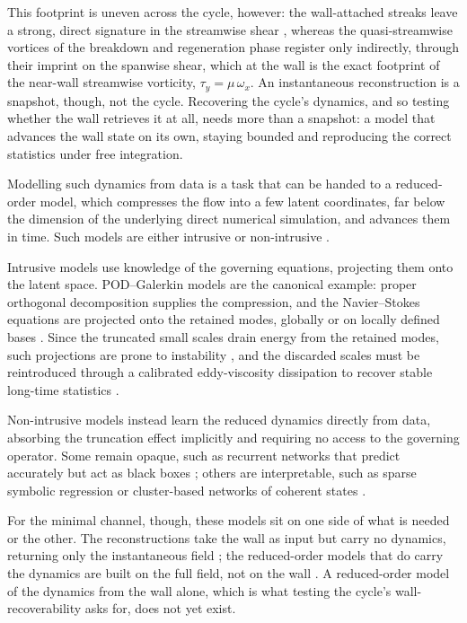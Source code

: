 \documentclass[pdflatex,sn-basic]{sn-jnl}
\theoremstyle{thmstyleone}%
\theoremstyle{thmstyletwo}%
\theoremstyle{thmstylethree}%
\begin{document}
This footprint is uneven across the cycle, however: the wall-attached streaks
leave a strong, direct signature in the streamwise shear
\citep{robinson1991coherent}, whereas the quasi-streamwise vortices of the
breakdown and regeneration phase register only indirectly, through their imprint
on the spanwise shear, which at the wall is the exact footprint of the near-wall
streamwise vorticity, $\tau_y = \mu\,\omega_x$. An instantaneous reconstruction
is a snapshot, though, not the cycle. Recovering the cycle's dynamics, and so
testing whether the wall retrieves it at all, needs more than a snapshot: a model
that advances the wall state on its own, staying bounded and reproducing the
correct statistics under free integration.

Modelling such dynamics from data is a task that can be handed to a reduced-order
model, which compresses the flow into a few latent coordinates, far below the
dimension of the underlying direct numerical simulation, and advances them in
time. Such models are either intrusive or non-intrusive \citep{benner2015survey}.

Intrusive models use knowledge of the governing equations, projecting them onto
the latent space. POD--Galerkin models are the canonical example: proper
orthogonal decomposition \citep{lumley1967structure,sirovich1987turbulence}
supplies the compression, and the Navier--Stokes equations are projected onto the
retained modes, globally \citep{Cavalieri_Nogueira_2022} or on locally defined
bases \citep{colanera2025qlrom,Colanera_MFU}. Since the truncated small scales
drain energy from the retained modes, such projections are prone to instability
\citep{rempfer2000low}, and the discarded scales must be reintroduced through a
calibrated eddy-viscosity dissipation to recover stable long-time statistics
\citep{Aubry_Holmes_Lumley_Stone_1988}.

Non-intrusive models instead learn the reduced dynamics directly from data,
absorbing the truncation effect implicitly and requiring no access to the
governing operator. Some remain opaque, such as recurrent networks that predict
accurately but act as black boxes \citep{Srinivasan_NN_MFU}; others are
interpretable, such as sparse symbolic regression \citep{brunton2016discovering}
or cluster-based networks of coherent states
\citep{kaiser2014cluster,fernex2021cluster}.

For the minimal channel, though, these models sit on one side of what is needed or
the other. The reconstructions take the wall as input but carry no dynamics,
returning only the instantaneous field \citep{guastoni2021convolutional}; the
reduced-order models that do carry the dynamics are built on the full field, not
on the wall \citep{nakamura2021convolutional}. A reduced-order model of the
dynamics from the wall alone, which is what testing the cycle's
wall-recoverability asks for, does not yet exist.
\end{document}

